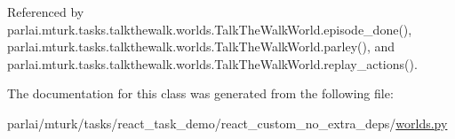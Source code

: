 Referenced by parlai.\+mturk.\+tasks.\+talkthewalk.\+worlds.\+Talk\+The\+Walk\+World.\+episode\+\_\+done(), parlai.\+mturk.\+tasks.\+talkthewalk.\+worlds.\+Talk\+The\+Walk\+World.\+parley(), and parlai.\+mturk.\+tasks.\+talkthewalk.\+worlds.\+Talk\+The\+Walk\+World.\+replay\+\_\+actions().



The documentation for this class was generated from the following file\+:\begin{DoxyCompactItemize}
\item 
parlai/mturk/tasks/react\+\_\+task\+\_\+demo/react\+\_\+custom\+\_\+no\+\_\+extra\+\_\+deps/\hyperlink{parlai_2mturk_2tasks_2react__task__demo_2react__custom__no__extra__deps_2worlds_8py}{worlds.\+py}\end{DoxyCompactItemize}
